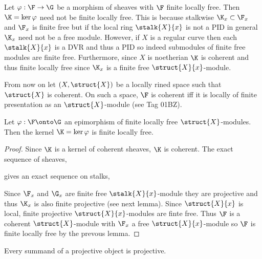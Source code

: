 \documentclass[12pt]{article}
\begin{document}
\begin{example}
Let $\varphi : \F \to \G$ be a morphism of sheaves with $\F$ finite locally free. Then $\K = \ker{\varphi}$ need not be finite locally free. This is because stalkwise $\K_x \subset \F_x$ and $\F_x$ is finite free but if the local ring $\stalk{X}{x}$ is not a PID in general $\K_x$ need not be a free module. However, if $X$ is a regular curve then each $\stalk{X}{x}$ is a DVR and thus a PID so indeed submodules of finite free modules are finite free. Furthermore, since $X$ is noetherian $\K$ is coherent and thus finite locally free since $\K_x$ is a finite free $\struct{X}{x}$-module.
\end{example}

\begin{rmk}
From now on let $(X, \struct{X})$ be a locally rined space such that $\struct{X}$ is coherent. On such a space, $\F$ is coherent iff it is locally of finite presentation as an $\struct{X}$-module (see Tag 01BZ).
\end{rmk}

\begin{prop}
Let $\varphi : \F \onto \G$ an epimorphism of finite locally free $\struct{X}$-modules. Then the kernel $\K = \ker{\varphi}$ is finite locally free.
\end{prop}

\begin{proof}
Since $\K$ is a kernel of coherent sheaves, $\K$ is coherent.
The exact sequence of sheaves,
\begin{center}
\end{center}
gives an exact sequence on stalks,
\begin{center}
\end{center}
Since $\F_x$ and $\G_x$ are finite free $\stalk{X}{x}$-module they are projective and thus $\K_x$ is also finite projective (see next lemma). Since $\struct{X}{x}$ is local, finite projective $\struct{X}{x}$-modules are finte free. Thus $\F$ is a coherent $\struct{X}$-module with $\F_x$ a free $\struct{X}{x}$-module so $\F$ is finite locally free by the prevous lemma.
\end{proof}

\begin{lemma}
Every summand of a projective object is projective. 
\end{lemma}
\end{document}
